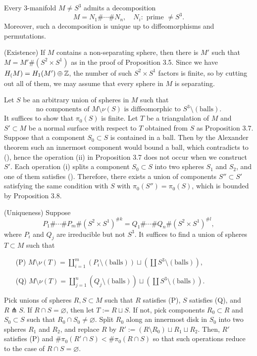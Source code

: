 \documentclass{../../../small}
\begin{document}
\begin{thm}
Every 3-manifold $M\ne S^3$ admits a decomposition
\[M=N_1\#\cdots\# N_n,\quad N_i:\text{ prime }\ne S^3.\]
Moreover, such a decomposition is unique up to diffeomorphisms and permutations.
\end{thm}
\begin{pf}
(Existence)
If $M$ contains a non-separating sphere, then there is $M'$ such that $M=M'\#(S^2\times S^1)$ as in the proof of Proposition 3.5.
Since we have $H_(M)=H_1(M')\oplus\mathbb{Z}$, the number of such $S^2\times S^1$ factors is finite, so by cutting out all of them, we may assume that every sphere in $M$ is separating.

Let $S$ be an arbitrary union of spheres in $M$ such that
\[\text{no components of $M\setminus\nu(S)$ is diffeomorphic to $S^3\setminus(\text{balls})$}.\tag{\dagger}\]
It suffices to show that $\pi_0(S)$ is finite.
Let $T$ be a triangulation of $M$ and $S'\subset M$ be a normal surface with respect to $T$ obtained from $S$ as Proposition 3.7.
Suppose that a component $S_0\subset S$ is contained in a ball.
Then by the Alexander theorem such an innermost component would bound a ball, which contradicts to (\dagger), hence the operation (ii) in Proposition 3.7 does not occur when we construct $S'$.
Each operation (i) splits a component $S_0\subset S$ into two spheres $S_1$ and $S_2$, and one of them satisfies (\dagger).
Therefore, there exists a union of components $S''\subset S'$ satisfying the same condition with $S$ with $\pi_0(S'')=\pi_0(S)$, which is bounded by Proposition 3.8.

(Uniqueness)
Suppose
\[P_1\#\cdots\#P_m\#(S^2\times S^1)^{\#k}=Q_1\#\cdots\#Q_n\#(S^2\times S^1)^{\#l},\]
where $P_i$ and $Q_j$ are irreducible but not $S^3$.
It suffices to find a union of spheres $T\subset M$ such that
\begin{enumerate}
\item[(P)]$M\setminus\nu(T)=\coprod_{i=1}^m(P_i\setminus(\text{balls}))\sqcup(\coprod S^3\setminus(\text{balls}))$,
\item[(Q)]$M\setminus\nu(T)=\coprod_{j=1}^n(Q_j\setminus(\text{balls}))\sqcup(\coprod S^3\setminus(\text{balls}))$.
\end{enumerate}
Pick unions of spheres $R,S\subset M$ such that $R$ satisfies (P), $S$ satisfies (Q), and $R\pitchfork S$.
If $R\cap S=\varnothing$, then let $T:=R\sqcup S$.
If not, pick components $R_0\subset R$ and $S_0\subset S$ such that $R_0\cap S_0\ne\varnothing$.
Split $R_0$ along an innermost disk in $S_0$ into two spheres $R_1$ and $R_2$, and replace $R$ by $R':=(R\setminus R_0)\sqcup R_1\sqcup R_2$.
Then, $R'$ satisfies (P) and $\#\pi_0(R'\cap S)<\#\pi_0(R\cap S)$ so that such operations reduce to the case of $R\cap S=\varnothing$.
\end{pf}
\end{document}
